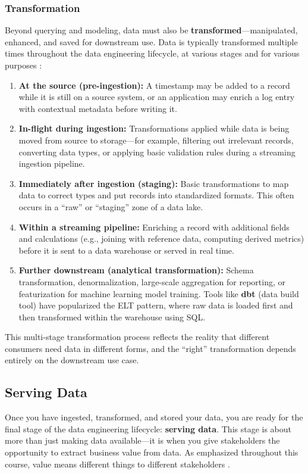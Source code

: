 \documentclass{article}
\begin{document}
\subsubsection{Transformation}
Beyond querying and modeling, data must also be \textbf{transformed}---manipulated, enhanced, and saved for downstream use. Data is typically transformed multiple times throughout the data engineering lifecycle, at various stages and for various purposes \cite{reis2022fundamentals}:

\begin{enumerate}
    \item \textbf{At the source (pre-ingestion):} A timestamp may be added to a record while it is still on a source system, or an application may enrich a log entry with contextual metadata before writing it.

    \item \textbf{In-flight during ingestion:} Transformations applied while data is being moved from source to storage---for example, filtering out irrelevant records, converting data types, or applying basic validation rules during a streaming ingestion pipeline.

    \item \textbf{Immediately after ingestion (staging):} Basic transformations to map data to correct types and put records into standardized formats. This often occurs in a ``raw'' or ``staging'' zone of a data lake.

    \item \textbf{Within a streaming pipeline:} Enriching a record with additional fields and calculations (e.g., joining with reference data, computing derived metrics) before it is sent to a data warehouse or served in real time.

    \item \textbf{Further downstream (analytical transformation):} Schema transformation, denormalization, large-scale aggregation for reporting, or featurization for machine learning model training. Tools like \textbf{dbt} (data build tool) \cite{dbt2020} have popularized the ELT pattern, where raw data is loaded first and then transformed within the warehouse using SQL.
\end{enumerate}

This multi-stage transformation process reflects the reality that different consumers need data in different forms, and the ``right'' transformation depends entirely on the downstream use case.

\subsection{Serving Data}
Once you have ingested, transformed, and stored your data, you are ready for the final stage of the data engineering lifecycle: \textbf{serving data}. This stage is about more than just making data available---it is when you give stakeholders the opportunity to extract business value from data. As emphasized throughout this course, value means different things to different stakeholders \cite{reis2022fundamentals}.
\end{document}
